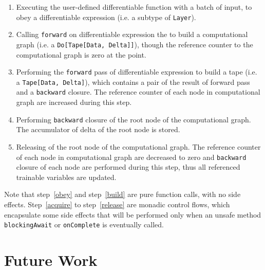 \begin{enumerate}
  \item Executing the user-defined \gls{differentiable function} with a batch of input, to obey a \gls{differentiable expression} (i.e. a subtype of \lstinline{Layer}).
  \label{obey}
  
  \item Calling \lstinline{forward} on \gls{differentiable expression} the to build a \gls{computational graph} (i.e. a \lstinline{Do[Tape[Data, Delta]]}), though the reference counter to the \gls{computational graph} is zero at the point.
  \label{build}
  
  \item Performing the \lstinline{forward} pass of \gls{differentiable expression} to build a tape (i.e. a \lstinline{Tape[Data, Delta]}), which contains a pair of the result of forward pass and a \lstinline{backward} closure. The reference counter of each node in \gls{computational graph} are increased during this step.
  \label{acquire}

  \item Performing \lstinline{backward} closure of the root node of the \gls{computational graph}. The accumulator of delta of the root node is stored.

  \item Releasing of the root node of the \gls{computational graph}. The reference counter of each node in \gls{computational graph} are decreased to zero and \lstinline{backward} closure of each node are performed during this step, thus all referenced \glspl{trainable variable} are updated.
  \label{release}

\end{enumerate}

Note that step~\ref{obey} and step~\ref{build} are pure function calls, with no side effects. Step~\ref{acquire} to step~\ref{release} are monadic control flows, which encapsulate some side effects that will be performed only when an unsafe method \lstinline{blockingAwait} or \lstinline{onComplete} is eventually called.

\section{Future Work}

